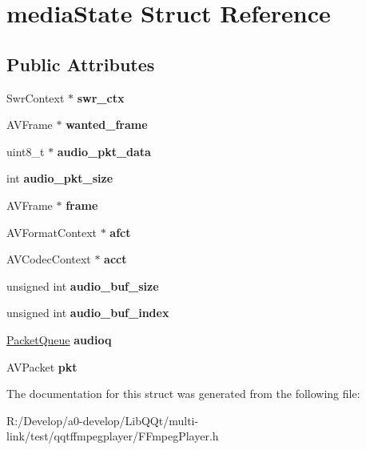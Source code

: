 \hypertarget{structmedia_state}{}\section{media\+State Struct Reference}
\label{structmedia_state}
\subsection*{Public Attributes}
\begin{DoxyCompactItemize}
\item 
\mbox{\label{structmedia_state_a10026618a5850c979b32082cba339552}} 
Swr\+Context $\ast$ {\bfseries swr\+\_\+ctx}
\item 
\mbox{\label{structmedia_state_acee833cad6e7f279b11ba179c8a6733f}} 
A\+V\+Frame $\ast$ {\bfseries wanted\+\_\+frame}
\item 
\mbox{\label{structmedia_state_a10d67759b774cb6537292ad930614b48}} 
uint8\+\_\+t $\ast$ {\bfseries audio\+\_\+pkt\+\_\+data}
\item 
\mbox{\label{structmedia_state_a103835e80bee35aecfa41bc9ea1151de}} 
int {\bfseries audio\+\_\+pkt\+\_\+size}
\item 
\mbox{\label{structmedia_state_a2a2383e3a92cb460af903f7c274a7876}} 
A\+V\+Frame $\ast$ {\bfseries frame}
\item 
\mbox{\label{structmedia_state_a362e5f2583b62184163f13c27d59d0d1}} 
A\+V\+Format\+Context $\ast$ {\bfseries afct}
\item 
\mbox{\label{structmedia_state_a834e47bcdd1ba798370ce1ed7b0a2e67}} 
A\+V\+Codec\+Context $\ast$ {\bfseries acct}
\item 
\mbox{\label{structmedia_state_a1ab447610adc267724dede5be31c8460}} 
unsigned int {\bfseries audio\+\_\+buf\+\_\+size}
\item 
\mbox{\label{structmedia_state_aafe85334098fee60ff5af05ebd12ddd3}} 
unsigned int {\bfseries audio\+\_\+buf\+\_\+index}
\item 
\mbox{\label{structmedia_state_a227b4b25817a84534d94021c78772535}} 
\mbox{\hyperlink{struct_packet_queue}{Packet\+Queue}} {\bfseries audioq}
\item 
\mbox{\label{structmedia_state_a9d28d4ea35146658068d1d0efb8115e8}} 
A\+V\+Packet {\bfseries pkt}
\end{DoxyCompactItemize}


The documentation for this struct was generated from the following file\+:\begin{DoxyCompactItemize}
\item 
R\+:/\+Develop/a0-\/develop/\+Lib\+Q\+Qt/multi-\/link/test/qqtffmpegplayer/F\+Fmpeg\+Player.\+h\end{DoxyCompactItemize}
